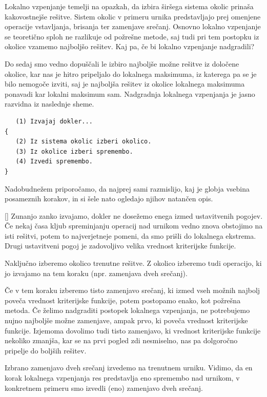 \documentclass[a4paper,10pt]{article}
\begin{document}
Lokalno vzpenjanje temelji na opazkah, da izbira širšega sistema okolic prinaša kakovostnejše
rešitve. Sistem okolic v primeru urnika predstavljajo prej omenjene operacije vstavljanja,
brisanja ter zamenjave srečanj. Osnovno lokalno vzpenjanje se teoretično sploh ne razlikuje
od požrešne metode, saj tudi pri tem postopku iz okolice vzamemo najboljšo rešitev. Kaj pa,
če bi lokalno vzpenjanje nadgradili?

Do sedaj smo vedno dopuščali le izbiro najboljše možne rešitve iz določene okolice, kar nas
je hitro pripeljalo do lokalnega maksimuma, iz katerega pa se je bilo nemogoče izviti, saj
je najboljša rešitev iz okolice lokalnega maksimuma ponavadi kar lokalni maksimum sam.
Nadgradnja lokalnega vzpenjanja je jasno razvidna iz naslednje sheme.

\begin{verbatim}
   (1) Izvajaj dokler...
{
   (2) Iz sistema okolic izberi okolico.
   (3) Iz okolice izberi spremembo.
   (4) Izvedi spremembo.
}
\end{verbatim}
%
Nadobudnežem priporočamo, da najprej sami razmislijo, kaj je globja vsebina posameznih
korakov, in si šele nato ogledajo njihov natančen opis.

[]
   Zunanjo zanko izvajamo, dokler ne dosežemo enega izmed ustavitvenih pogojev.
   Če nekaj časa kljub spreminjanju operacij nad urnikom vedno znova obstojimo na isti
   rešitvi, potem to najverjetneje pomeni, da smo prišli do lokalnega ekstrema. Drugi
   ustavitveni pogoj je zadovoljivo velika vrednost kriterijske funkcije.

   Naključno izberemo okolico trenutne rešitve. Z okolico izberemo tudi operacijo,
   ki jo izvajamo na tem koraku (npr. zamenjava dveh srečanj).

   Če v tem koraku izberemo tisto zamenjavo srečanj, ki izmed vseh možnih najbolj
   poveča vrednost kriterijske funkcije, potem postopamo enako, kot požrešna metoda. Če
   želimo nadgraditi postopek lokalnega vzpenjanja, ne potrebujemo nujno najboljše možne
   zamenjave, ampak prvo, ki poveča vrednost kriterijske funkcije. Izjemoma dovolimo tudi
   tisto zamenjavo, ki vrednost kriterijske funkcije nekoliko zmanjša, kar se na prvi
   pogled zdi nesmiselno, nas pa dolgoročno pripelje do boljših rešitev.

   Izbrano zamenjavo dveh srečanj izvedemo na trenutnem urniku. Vidimo, da en korak
   lokalnega vzpenjanja res predstavlja eno spremembo nad urnikom, v konkretnem primeru
   smo izvedli (eno) zamenjavo dveh srečanj.
\end{document}
